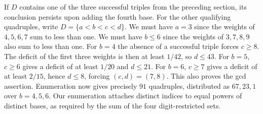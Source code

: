 \documentclass[11pt]{article}
\begin{document}
If $D$ contains one of the three successful triples from the preceding
section, its conclusion persists upon adding the fourth base. For the
other qualifying quadruples, write $D=\{a<b<c<d\}$. We must have
$a=3$ since the weights of $4,5,6,7$ sum to less than one. We must have
$b\le6$ since the weights of $3,7,8,9$ also sum to less than one.
For $b=4$ the absence of a successful triple forces $c\ge8$.
The deficit of the first three weights is then at least $1/42$, so
$d\le43$. For $b=5$, $c\ge6$ gives a deficit of at least $1/20$
and $d\le21$. For $b=6$, $c\ge7$ gives a deficit of at least
$2/15$, hence $d\le8$, forcing $(c,d)=(7,8)$. This also proves
the gcd assertion. Enumeration now gives precisely $91$ quadruples,
distributed as $67,23,1$ over $b=4,5,6$. Our enumeration attaches
distinct indices to equal powers of distinct bases, as required by
the sum of the four digit-restricted sets.
\end{document}

